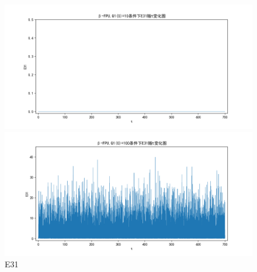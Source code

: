\documentclass[10pt, a4paper]{article}
\begin{document}
    \begin{figure}[H]
        \begin{minipage}[t]{0.49\textwidth}
            \centering
            \includegraphics[width=\textwidth]{./q6_pics/cmp/E31.png}
        \end{minipage}
        \begin{minipage}[t]{0.49\textwidth}
            \centering
            \includegraphics[width=\textwidth]{./q6_pics/exp/E31.png}
        \end{minipage}
        \caption{E31}\label{fig:E31 in q6}
    \end{figure}
\end{document}
